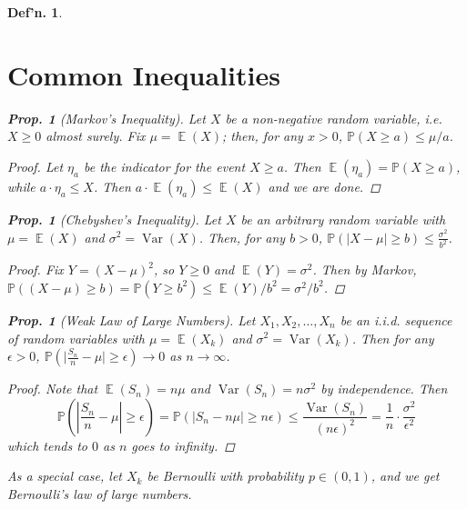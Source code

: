\documentclass[12pt, a4paper]{book}
\DeclareMathOperator{\E}{\mathbb{E}}
\DeclareMathOperator{\Var}{Var}
\renewcommand{\Pr}{\mathbb{P}}
\newtheorem{definition}[theorem]{Def'n.}
\newtheorem{proposition}[theorem]{Prop.}
\theoremstyle{nonumberplain}
\newtheorem{proof}{Proof}
\begin{document}
\begin{definition}
\section{Common Inequalities}
\begin{proposition}[Markov's Inequality]
    Let $X$ be a non-negative random variable, i.e. $X\geq 0$ almost surely.
    Fix $\mu=\E(X)$; then, for any $x>0$, $\Pr(X\geq a)\leq\mu/a$.
\end{proposition}
\begin{proof}
    Let $\eta_a$ be the indicator for the event $X\geq a$.
    Then $\E(\eta_a)=\Pr(X\geq a)$, while $a\cdot\eta_a\leq X$.
    Then $a\cdot \E(\eta_a)\leq\E(X)$ and we are done.
\end{proof}
\begin{proposition}[Chebyshev's Inequality]
    Let $X$ be an arbitrary random variable with $\mu=\E(X)$ and $\sigma^2=\Var(X)$.
    Then, for any $b>0$, $\Pr(|X-\mu|\geq b)\leq\frac{\sigma^2}{b^2}$.
\end{proposition}
\begin{proof}
    Fix $Y=(X-\mu)^2$, so $Y\geq 0$ and $\E(Y)=\sigma^2$.
    Then by Markov, $\Pr((X-\mu)\geq b)=\Pr(Y\geq b^2)\leq\E(Y)/b^2=\sigma^2/b^2$.
\end{proof}
\begin{proposition}[Weak Law of Large Numbers]
    Let $X_1,X_2,\ldots,X_n$ be an i.i.d. sequence of random variables with $\mu=\E(X_k)$ and $\sigma^2=\Var(X_k)$.
    Then for any $\epsilon>0$, $\Pr\left(\lvert\frac{S_n}{n}-\mu\rvert\geq\epsilon\right)\to 0$ as $n\to\infty$.
\end{proposition}
\begin{proof}
    Note that $\E(S_n)=n\mu$ and $\Var(S_n)=n\sigma^2$ by independence.
    Then
    \begin{equation*}
        \Pr\left(\left\lvert\frac{S_n}{n}-\mu\right\rvert\geq\epsilon\right)=\Pr(|S_n-n\mu|\geq n\epsilon)\leq\frac{\Var(S_n)}{(n\epsilon)^2}=\frac{1}{n}\cdot\frac{\sigma^2}{\epsilon^2}
    \end{equation*}
    which tends to $0$ as $n$ goes to infinity.
\end{proof}
As a special case, let $X_k$ be Bernoulli with probability $p\in(0,1)$, and we get Bernoulli's law of large numbers.


\end{definition}
\end{document}
